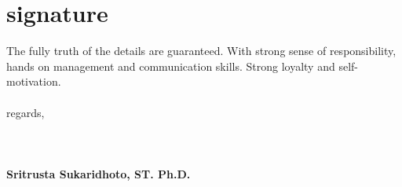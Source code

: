 \documentclass[]{friggeri-cv} %
\begin{document}

\pagebreak

\section{signature}

The fully truth of the details are guaranteed. 
With strong sense of responsibility, hands on management and communication skills. 
Strong loyalty and self-motivation. 
\\
\\ 
regards, 
\\ 
\\
\\
\\
\textbf{Sritrusta Sukaridhoto, ST. Ph.D.} 
\end{document}
